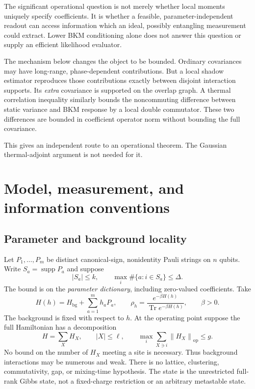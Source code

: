 \documentclass[11pt,a4paper]{article}
\theoremstyle{remark}
\newcommand{\Tr}{\operatorname{Tr}}
\newcommand{\supp}{\operatorname{supp}}
\newcommand{\norm}[1]{\left\lVert #1\right\rVert}
\begin{document}
The significant operational question is not merely whether local moments uniquely specify coefficients. It is whether a feasible, parameter-independent readout can access information which an ideal, possibly entangling measurement could extract. Lower BKM conditioning alone does not answer this question or supply an efficient likelihood evaluator.

The mechanism below changes the object to be bounded. Ordinary covariances may have long-range, phase-dependent contributions. But a local shadow estimator reproduces those contributions exactly between disjoint interaction supports. Its \emph{extra} covariance is supported on the overlap graph. A thermal correlation inequality similarly bounds the noncommuting difference between static variance and BKM response by a local double commutator. These two differences are bounded in coefficient operator norm without bounding the full covariance.

This gives an independent route to an operational theorem. The Gaussian thermal-adjoint argument is not needed for it.

\section{Model, measurement, and information conventions}

\subsection{Parameter and background locality}
Let $P_1,\ldots,P_m$ be distinct canonical-sign, nonidentity Pauli strings on $n$ qubits. Write $S_a=\supp P_a$ and suppose
\begin{equation}
 |S_a|\le k,\qquad
 \max_i\#\{a:i\in S_a\}\le\Delta.
 \label{eq:dictionary}
\end{equation}
The bound is on the \emph{parameter dictionary}, including zero-valued coefficients. Take
\begin{equation}
 H(h)=H_{\mathrm{bg}}+\sum_{a=1}^m h_aP_a,
 \qquad \rho_h=\frac{e^{-\beta H(h)}}{\Tr e^{-\beta H(h)}},\qquad\beta>0.
 \label{eq:family}
\end{equation}
The background is fixed with respect to $h$. At the operating point suppose the full Hamiltonian has a decomposition
\begin{equation}
 H=\sum_X H_X,\qquad |X|\le\ell,\qquad
 \max_i\sum_{X\ni i}\norm{H_X}_{\mathrm{op}}\le g.
 \label{eq:Hlocal}
\end{equation}
No bound on the number of $H_X$ meeting a site is necessary. Thus background interactions may be numerous and weak. There is no lattice, clustering, commutativity, gap, or mixing-time hypothesis. The state is the unrestricted full-rank Gibbs state, not a fixed-charge restriction or an arbitrary metastable state.
\end{document}
